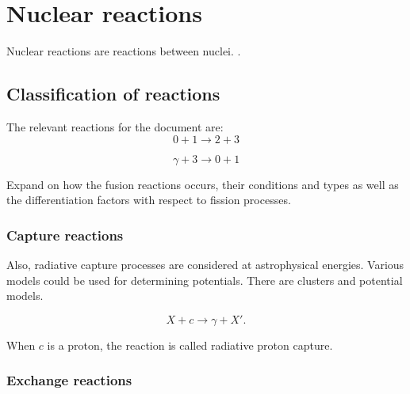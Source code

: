 \documentclass[openany]{book}
\begin{document}





\section{Nuclear reactions} \label{sec:nuclearReactions}

Nuclear reactions are reactions between nuclei.  \cite{bertulani_2003}. 



\subsection{Classification of reactions} \label{sub:classificationReactions}

The relevant reactions for the document are:
\begin{equation} \label{eq:nuclearReaction_general}
	0 + 1 \rightarrow 2 + 3
\end{equation}

\begin{equation} \label{eq:nuclearReaction_gammaCapture}
	\gamma + 3 \rightarrow 0 + 1
\end{equation}

Expand  on how the fusion reactions occurs, their conditions and types as well as the differentiation factors with respect to fission processes.

\subsubsection{Capture reactions} \label{ssub:captureReactions}

Also, radiative capture processes are considered at astrophysical energies. Various models could be used for determining potentials. There are clusters and potential models.

\begin{equation}  \label{eq:nuclearReaction_capture}
	X + c \rightarrow  \gamma + X'.
\end{equation}

When $c$ is a proton, the reaction is called radiative proton capture. \cite{brune_davids_2015}

\subsubsection{Exchange reactions}  \label{ssub:exchangeReactions}
\end{document}
